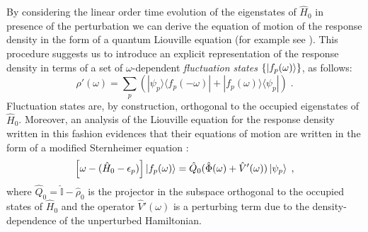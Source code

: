 \documentclass[reprint,aps,prb]{revtex4-1}
\newcommand{\eps}{\epsilon}
\newcommand{\be}{\begin{equation}}
\newcommand{\ee}{\end{equation}}
\newcommand{\lb}{\label}
\newcommand{\op}[1]{\hat {#1}}
\newcommand{\ketbra}[2]{| #1 \rangle \langle #2 |}
\newcommand{\dmnot}{\op{\rho}_0}
\newcommand{\dm}{\op{\rho}}
\newcommand{\hnot}{\op{H}_0}
\newcommand{\identity}{\op{\mathbb I}}
\begin{document}
By considering the linear order time evolution of the eigenstates of $\hnot$ in presence of the perturbation we can derive the equation of motion of the response density in the form of 
a quantum Liouville equation (for example see \cite{baroni2008}). This procedure suggests us to introduce an explicit representation of the response density in terms of a set of 
$\omega$-dependent \emph{fluctuation states} $\{\ket{f_p(\omega)}\}$, as follows: 
\be\lb{rhoPrimeFluctuationStateDef1}
\dm'(\omega) = \sum_p\left(\ketbra{\psi_p}{f_p(-\omega)} + \ketbra{f_p(\omega)}{\psi_p}\right) \;.
\ee
Fluctuation states are, by construction, orthogonal to the occupied eigenstates of $\hnot$. Moreover, an analysis of the Liouville equation for the response density written in this 
fashion evidences that their equations of motion are written in the form of a modified Sternheimer equation \cite{mahan1980}:
\be\lb{fluctuationStateEqMotion1}
\left[\omega - (\hnot-\eps_p)\right]\ket{f_p(\omega)} = \op Q_0(\op\Phi(\omega)+\op V'(\omega))\ket{\psi_p} \;,
\ee
where $\op Q_0=\identity-\dmnot$ is the projector in the subspace orthogonal to the occupied states of $\hnot$ and the operator $\op V'(\omega)$ is a perturbing term due to the 
density-dependence of the unperturbed Hamiltonian.
\end{document}

